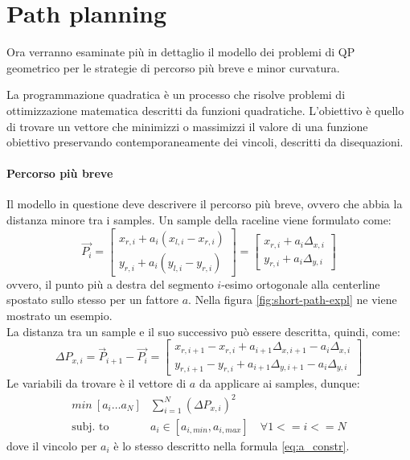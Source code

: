 \section{Path planning}
\label{sec:path-models}
Ora verranno esaminate più in dettaglio il modello dei problemi di QP
geometrico per le strategie di percorso più breve e minor curvatura.

La programmazione quadratica è un processo che risolve problemi di ottimizzazione matematica descritti da
funzioni quadratiche. L'obiettivo è quello di trovare un vettore che minimizzi o massimizzi il valore di
una funzione obiettivo preservando contemporaneamente dei vincoli, descritti da disequazioni.

\paragraph{Percorso più breve}\cite{race-model}\cite{globalplanning-lec}
Il modello in questione deve descrivere il percorso più breve, ovvero che abbia la distanza minore tra i
samples. Un sample della raceline viene formulato come:
\[
	\overrightarrow{P_i} =
	\begin{bmatrix}
		x_{r,i} + a_i(x_{l,i} - x_{r,i}) \\
		y_{r,i} + a_i(y_{l,i} - y_{r,i})
	\end{bmatrix} =
	\begin{bmatrix}
		x_{r,i} + a_i\Delta_{x,i} \\
		y_{r,i} + a_i\Delta_{y,i}
	\end{bmatrix}
\]
ovvero, il punto più a destra del segmento $i$-esimo ortogonale alla centerline spostato sullo stesso per
un fattore $a$. Nella figura \ref{fig:short-path-expl} ne viene mostrato un esempio.\\
La distanza tra un sample e il suo successivo può essere descritta, quindi, come:
\[
	\Delta P_{x, i} = \overrightarrow{P}_{i+1} - \overrightarrow{P_i} = \begin{bmatrix}
		x_{r,i+1} - x_{r,i} + a_{i+1}\Delta_{x,i+1} - a_i\Delta_{x, i} \\
		y_{r,i+1} - y_{r,i} + a_{i+1}\Delta_{y,i+1} - a_i\Delta_{y, i}
	\end{bmatrix}
\]
Le variabili da trovare è il vettore di $a$ da applicare ai samples, dunque:
\[
	\begin{aligned}
		min\ [a_i \dots a_N] & \sum_{i=1}^{N} (\Delta P_{x,i})^2                          \\
		\text{subj. to}\     & a_i \in [a_{i, min}, a_{i, max}] \quad \forall 1 <= i <= N
	\end{aligned}
\]
dove il vincolo per $a_i$ è lo stesso descritto nella formula \ref{eq:a_constr}.

